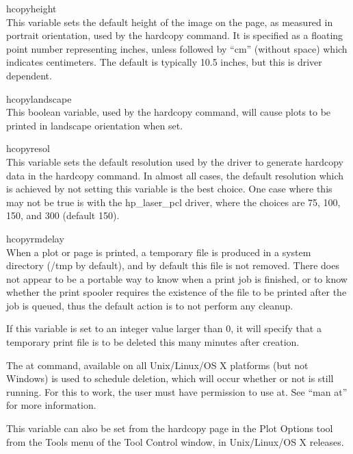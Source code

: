 \begin{description}
\item{\et hcopyheight}\\
This variable sets the default height of the image on the page, as
measured in portrait orientation, used by the {\cb hardcopy} command.  It is
specified as a floating point number representing inches, unless
followed by ``cm'' (without space) which indicates centimeters.  The
default is typically 10.5 inches, but this is driver dependent.

\item{\et hcopylandscape}\\
This boolean variable, used by the {\cb hardcopy} command, will cause plots
to be printed in landscape orientation when set.

\item{\et hcopyresol}\\
This variable sets the default resolution used by the driver to
generate hardcopy data in the {\cb hardcopy} command.  In almost all
cases, the default resolution which is achieved by not setting this
variable is the best choice.  One case where this may not be true is
with the {\vt hp\_laser\_pcl} driver, where the choices are 75, 100,
150, and 300 (default 150).

\item{\et hcopyrmdelay}\\
When a plot or page is printed, a temporary file is produced in a
system directory ({\vt /tmp} by default), and by default this file is
not removed.  There does not appear to be a portable way to know when
a print job is finished, or to know whether the print spooler requires
the existence of the file to be printed after the job is queued, thus
the default action is to not perform any cleanup.

If this variable is set to an integer value larger than 0, it will
specify that a temporary print file is to be deleted this many minutes
after creation.

The {\vt at} command, available on all Unix/Linux/OS X platforms (but
not Windows) is used to schedule deletion, which will occur whether or
not {\WRspice} is still running.  For this to work, the user must have
permission to use {\vt at}.  See ``{\vt man at}'' for more
information.

This variable can also be set from the {\cb hardcopy} page in the {\cb
Plot Options} tool from the {\cb Tools} menu of the {\cb Tool Control}
window, in Unix/Linux/OS X releases.


\end{description}
